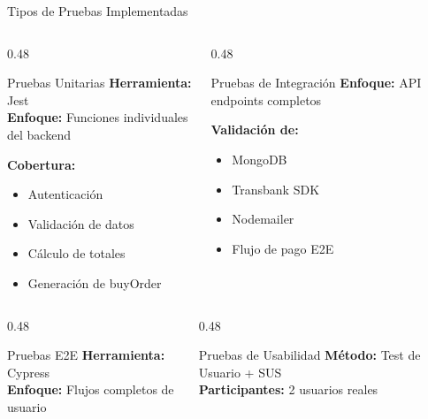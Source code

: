 \documentclass[aspectratio=169]{beamer}
\begin{document}
\begin{frame}{Tipos de Pruebas Implementadas}
\begin{columns}[T]
\begin{column}{0.48\textwidth}
\begin{block}{Pruebas Unitarias}
\textbf{Herramienta:} Jest \\
\textbf{Enfoque:} Funciones individuales del backend
\end{block}

\vspace{0.2cm}

\textbf{Cobertura:}
\begin{itemize}
    \item Autenticación
    \item Validación de datos
    \item Cálculo de totales
    \item Generación de buyOrder
\end{itemize}
\end{column}

\begin{column}{0.48\textwidth}
\begin{block}{Pruebas de Integración}
\textbf{Enfoque:} API endpoints completos
\end{block}

\vspace{0.2cm}

\textbf{Validación de:}
\begin{itemize}
    \item MongoDB
    \item Transbank SDK
    \item Nodemailer
    \item Flujo de pago E2E
\end{itemize}
\end{column}
\end{columns}

\vspace{0.5cm}

\begin{columns}[T]
\begin{column}{0.48\textwidth}
\begin{block}{Pruebas E2E}
\textbf{Herramienta:} Cypress \\
\textbf{Enfoque:} Flujos completos de usuario
\end{block}
\end{column}

\begin{column}{0.48\textwidth}
\begin{block}{Pruebas de Usabilidad}
\textbf{Método:} Test de Usuario + SUS \\
\textbf{Participantes:} 2 usuarios reales
\end{block}
\end{column}
\end{columns}
\end{frame}
\end{document}
